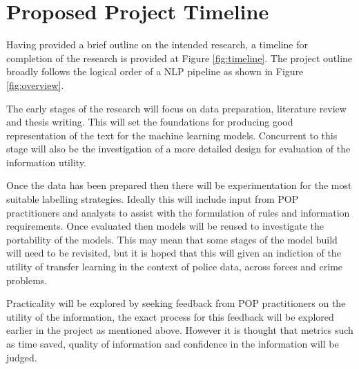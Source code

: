 \section{Proposed Project Timeline} Having provided a brief outline on the intended research, a timeline for completion of the research is provided at Figure \ref{fig:timeline}. The project outline broadly follows the logical order of a NLP pipeline as shown in Figure \ref{fig:overview}. 

The early stages of the research will focus on data preparation, literature review and thesis writing. This will set the foundations for producing good representation of the text for the machine learning models. Concurrent to this stage will also be the investigation of a more detailed design for evaluation of the information utility.

Once the data has been prepared then there will be experimentation for the most suitable labelling strategies. Ideally this will include input from POP practitioners and analysts to assist with the formulation of rules and information requirements.   Once evaluated then models will be reused to investigate the portability of the models. This may mean that some stages of the model build will need to be revisited, but it is hoped that this will given an indiction of the utility of transfer learning in the context of police data, across forces and crime problems. 

Practicality will be explored by seeking feedback from POP practitioners on the utility of the information, the exact process for this feedback will be explored earlier in the project as mentioned above. However it is thought that metrics such as time saved,  quality of information and confidence in the information will be judged.

